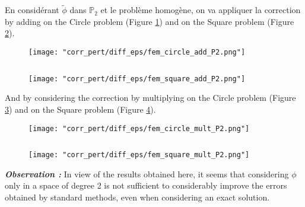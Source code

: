 \begin{Rem}
	En considérant $\tilde{\phi}$ dans $\mathbb{P}_2$ et le problème homogène, on va appliquer la correction by adding on the Circle problem (Figure \ref{corr_pert_fem_circle_add_P2}) and on the Square problem (Figure \ref{corr_pert_fem_square_add_P2}).
	
	\begin{minipage}{0.48\linewidth}
		\begin{figure}[H]
			\centering
			\texttt{[image: "corr\_pert/diff\_eps/fem\_circle\_add\_P2.png"]}
			\label{corr_pert_fem_circle_add_P2}
		\end{figure} 
	\end{minipage} $\qquad$
	\begin{minipage}{0.48\linewidth}
		\begin{figure}[H]
			\centering
			\texttt{[image: "corr\_pert/diff\_eps/fem\_square\_add\_P2.png"]}
			\label{corr_pert_fem_square_add_P2}
		\end{figure} 
	\end{minipage}
	
	And by considering the correction by multiplying on the Circle problem (Figure \ref{corr_pert_fem_circle_mult_P2}) and on the Square problem (Figure \ref{corr_pert_fem_square_mult_P2}).
	
	\begin{minipage}{0.48\linewidth}
		\begin{figure}[H]
			\centering
			\texttt{[image: "corr\_pert/diff\_eps/fem\_circle\_mult\_P2.png"]}
			\label{corr_pert_fem_circle_mult_P2}
		\end{figure} 
	\end{minipage} $\qquad$
	\begin{minipage}{0.48\linewidth}
		\begin{figure}[H]
			\centering
			\texttt{[image: "corr\_pert/diff\_eps/fem\_square\_mult\_P2.png"]}
			\label{corr_pert_fem_square_mult_P2}
		\end{figure} 
	\end{minipage}
	\textbf{\textit{Observation :}} In view of the results obtained here, it seems that considering $\phi$ only in a space of degree 2 is not sufficient to considerably improve the errors obtained by standard methods, even when considering an exact solution.
\end{Rem}

